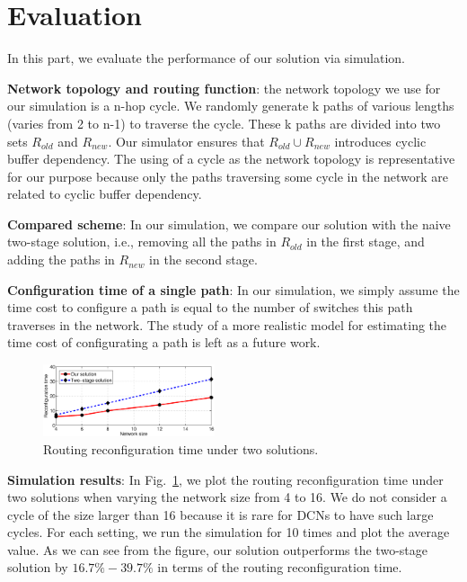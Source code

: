 \section{Evaluation}\label{sec:evaluation}

In this part, we evaluate the performance of our solution via simulation.

\textbf{Network topology and routing function}: the network topology we use for our simulation is a n-hop cycle. We randomly generate k paths of various lengths (varies from 2 to n-1) to traverse  the cycle. These k paths are divided into two sets $R_{old}$ and $R_{new}$. Our simulator ensures that  $R_{old} \cup R_{new}$ introduces cyclic buffer dependency. The using of a cycle as the network topology is representative for our purpose because only the paths
traversing some cycle in the network are related to cyclic buffer dependency. 

 

\textbf{Compared scheme}: In our simulation, we compare our solution with the naive two-stage solution, i.e., removing all the paths in $R_{old}$ in the first stage, and adding the paths in $R_{new}$ in the second stage.

\textbf{Configuration time of a single path}: In our simulation, we simply assume the time cost to configure a path is equal to the number of switches this path traverses in the network. The study of a more realistic model for estimating the time cost of configurating a path is left as a future work.

\begin{figure}[t]
	\centering
	\includegraphics[width=0.45\textwidth] {figs/conftime.eps}
	\caption{Routing reconfiguration time under two solutions.}\label{fig:conftime}
	\vspace{-0.3in}
\end{figure}

\textbf{Simulation results}: In Fig.~\ref{fig:conftime}, we plot the routing reconfiguration time under two solutions when varying the network size from 4 to 16. We do not consider a cycle of the size larger than 16 because it is rare for DCNs to have such large cycles. For each setting, we run the simulation for 10 times and plot the average value. As we can see from the figure, our solution outperforms the two-stage solution by $16.7\% - 39.7\%$ in terms of the routing reconfiguration time.